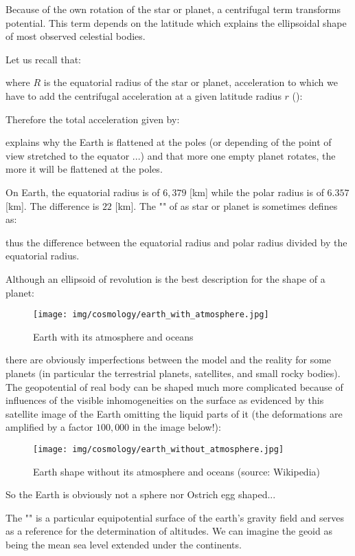 	Because of the own rotation of the star or planet, a centrifugal term transforms potential. This term depends on the latitude which explains the ellipsoidal shape of most observed celestial bodies.
	
	Let us recall that:
	
	where $R$ is the equatorial radius of the star or planet, acceleration to which we have to add the centrifugal acceleration at a given latitude radius $r$ ():
	
	Therefore the total acceleration given by:
	
	explains why the Earth is flattened at the poles (or depending of the point of view stretched to the equator ...) and that more one empty planet rotates, the more it will be flattened at the poles.
	
	On Earth, the equatorial radius is of $6,379$ [km] while the polar radius is of $6.357$ [km]. The difference is $22$ [km]. The "" of as star or planet is sometimes defines as:
	
	thus the difference between the equatorial radius and polar radius divided by the equatorial radius.
	
	Although an ellipsoid of revolution is the best description for the shape of a planet:
	\begin{figure}[H]
		\centering
		\texttt{[image: img/cosmology/earth\_with\_atmosphere.jpg]}	
		\caption{Earth with its atmosphere and oceans}
	\end{figure}
	there are obviously imperfections between the model and the reality for some planets (in particular the terrestrial planets, satellites, and small rocky bodies). The geopotential of real body can be shaped much more complicated because of influences of the visible inhomogeneities on the surface as evidenced by this satellite image of the Earth omitting the liquid parts of it (the deformations are amplified by a factor $100,000$ in the image below!):
	\begin{figure}[H]
		\centering
		\texttt{[image: img/cosmology/earth\_without\_atmosphere.jpg]}	
		\caption[Earth shape without its atmosphere and oceans]{Earth shape without its atmosphere and oceans (source: Wikipedia)}
	\end{figure}
	So the Earth is obviously not a sphere nor Ostrich egg shaped...
	
	The "" is a particular equipotential surface of the earth's gravity field and serves as a reference for the determination of altitudes. We can imagine the geoid as being the mean sea level extended under the continents.
	

